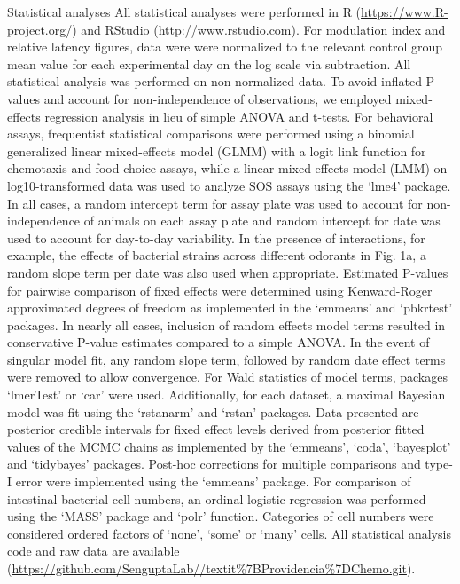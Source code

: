 \documentclass[]{article}
\begin{document}
Statistical analyses All statistical analyses were performed in R
(\url{https://www.R-project.org/}) and RStudio
(\url{http://www.rstudio.com}). For modulation index and relative
latency figures, data were were normalized to the relevant control group
mean value for each experimental day on the log scale via subtraction.
All statistical analysis was performed on non-normalized data. To avoid
inflated P-values and account for non-independence of observations, we
employed mixed-effects regression analysis in lieu of simple ANOVA and
t-tests. For behavioral assays, frequentist statistical comparisons were
performed using a binomial generalized linear mixed-effects model (GLMM)
with a logit link function for chemotaxis and food choice assays, while
a linear mixed-effects model (LMM) on log10-transformed data was used to
analyze SOS assays using the `lme4' package. In all cases, a random
intercept term for assay plate was used to account for non-independence
of animals on each assay plate and random intercept for date was used to
account for day-to-day variability. In the presence of interactions, for
example, the effects of bacterial strains across different odorants in
Fig. 1a, a random slope term per date was also used when appropriate.
Estimated P-values for pairwise comparison of fixed effects were
determined using Kenward-Roger approximated degrees of freedom as
implemented in the `emmeans' and `pbkrtest' packages. In nearly all
cases, inclusion of random effects model terms resulted in conservative
P-value estimates compared to a simple ANOVA. In the event of singular
model fit, any random slope term, followed by random date effect terms
were removed to allow convergence. For Wald statistics of model terms,
packages `lmerTest' or `car' were used. Additionally, for each dataset,
a maximal Bayesian model was fit using the `rstanarm' and `rstan'
packages. Data presented are posterior credible intervals for fixed
effect levels derived from posterior fitted values of the MCMC chains as
implemented by the `emmeans', `coda', `bayesplot' and `tidybayes'
packages. Post-hoc corrections for multiple comparisons and type-I error
were implemented using the `emmeans' package. For comparison of
intestinal bacterial cell numbers, an ordinal logistic regression was
performed using the `MASS' package and `polr' function. Categories of
cell numbers were considered ordered factors of `none', `some' or `many'
cells. All statistical analysis code and raw data are available
(\url{https://github.com/SenguptaLab//textit\%7BProvidencia\%7DChemo.git}).
\end{document}
